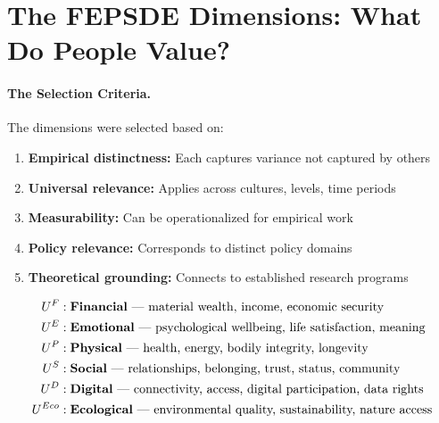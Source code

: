 
\section{The FEPSDE Dimensions: What Do People Value?}
\label{sec:fepsde-dimensions}


\paragraph{The Selection Criteria.}
The dimensions were selected based on:
\begin{enumerate}[nosep]
  \item \textbf{Empirical distinctness:} Each captures variance not captured by others
  \item \textbf{Universal relevance:} Applies across cultures, levels, time periods
  \item \textbf{Measurability:} Can be operationalized for empirical work
  \item \textbf{Policy relevance:} Corresponds to distinct policy domains
  \item \textbf{Theoretical grounding:} Connects to established research programs
\end{enumerate}

\begin{definition}
\label{def:fepsde}
\begin{align}
  U^F &: \text{\textbf{Financial} --- material wealth, income, economic security} \\
  U^E &: \text{\textbf{Emotional} --- psychological wellbeing, life satisfaction, meaning} \\
  U^P &: \text{\textbf{Physical} --- health, energy, bodily integrity, longevity} \\
  U^S &: \text{\textbf{Social} --- relationships, belonging, trust, status, community} \\
  U^D &: \text{\textbf{Digital} --- connectivity, access, digital participation, data rights} \\
  U^{Eco} &: \text{\textbf{Ecological} --- environmental quality, sustainability, nature access}
\end{align}
\end{definition}

